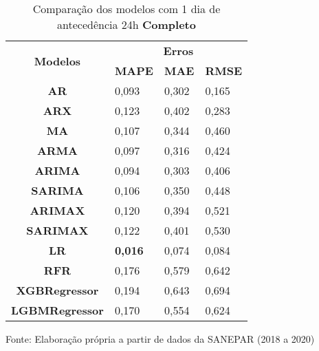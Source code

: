 \begin{table}[H]
	\centering
	\caption{Comparação dos modelos com 1 dia de antecedência 24h \textbf{Completo} }\label{tb:1-24cm}
	\begin{tabular}{@{}clll@{}}
		\toprule
		\multirow{2}{*}{\textbf{Modelos}} & \multicolumn{3}{c}{\textbf{Erros}}                                                                       \\ \cmidrule(l){2-4} 
		& \multicolumn{1}{c}{\textbf{MAPE}} & \multicolumn{1}{c}{\textbf{MAE}} & \multicolumn{1}{c}{\textbf{RMSE}} \\ \hline
\textbf{AR}                       & 0,093                             & 0,302                            & 0,165                             \\
\textbf{ARX}                      & 0,123                             & 0,402                            & 0,283                             \\
\textbf{MA}                       & 0,107                             & 0,344                            & 0,460                             \\
\textbf{ARMA}                     & 0,097                             & 0,316                            & 0,424                             \\
\textbf{ARIMA}                    & 0,094                             & 0,303                            & 0,406                             \\
\textbf{SARIMA}                   & 0,106                             & 0,350                            & 0,448                             \\
\textbf{ARIMAX}                   & 0,120                             & 0,394                            & 0,521                             \\
\textbf{SARIMAX}                  & 0,122                             & 0,401                            & 0,530                             \\
\textbf{LR}                       & \textbf{0,016}                             & 0,074                            & 0,084                             \\
\textbf{RFR}                      & 0,176                             & 0,579                            & 0,642                             \\
\textbf{XGBRegressor}             & 0,194                             & 0,643                            & 0,694                             \\
\textbf{LGBMRegressor}            & 0,170                             & 0,554                            & 0,624                             \\ \bottomrule
	\end{tabular}

Fonte: Elaboração própria a partir de dados da SANEPAR (2018 a 2020)
\end{table}


